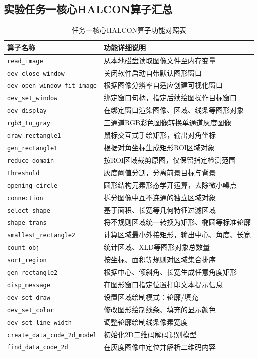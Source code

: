 \documentclass[UTF8,a4paper,12pt]{ctexart}
\begin{document}
\subsection{实验任务一核心HALCON算子汇总}
\begin{table}[H]
\centering
\caption{任务一核心HALCON算子功能对照表}
\begin{tabularx}{0.94\textwidth}{|l|X|}
\hline
\textbf{算子名称} & \textbf{功能详细说明} \\
\hline
\texttt{read\_image} & 从本地磁盘读取图像文件至内存变量 \\
\texttt{dev\_close\_window} & 关闭软件启动自带默认图形窗口 \\
\texttt{dev\_open\_window\_fit\_image} & 根据图像分辨率自适应创建可视化窗口 \\
\texttt{dev\_set\_window} & 绑定窗口句柄，指定后续绘图操作目标窗口 \\
\texttt{dev\_display} & 在绑定窗口渲染图像、区域、线条等图形对象 \\
\texttt{rgb3\_to\_gray} & 三通道RGB彩色图像转换单通道灰度图像 \\
\texttt{draw\_rectangle1} & 鼠标交互式手绘矩形，输出对角坐标 \\
\texttt{gen\_rectangle1} & 根据对角坐标生成矩形ROI区域对象 \\
\texttt{reduce\_domain} & 按ROI区域裁剪原图，仅保留指定检测范围 \\
\texttt{threshold} & 灰度阈值分割，分离前景目标与背景 \\
\texttt{opening\_circle} & 圆形结构元素形态学开运算，去除微小噪点 \\
\texttt{connection} & 拆分图像中互不连通的独立区域对象 \\
\texttt{select\_shape} & 基于面积、长宽等几何特征过滤区域 \\
\texttt{shape\_trans} & 将不规则区域统一转换为矩形、椭圆等标准轮廓 \\
\texttt{smallest\_rectangle2} & 计算区域最小外接矩形，输出中心、角度、长宽 \\
\texttt{count\_obj} & 统计区域、XLD等图形对象总数量 \\
\texttt{sort\_region} & 按坐标、面积等规则对区域集合排序 \\
\texttt{gen\_rectangle2} & 根据中心、倾斜角、长宽生成任意角度矩形 \\
\texttt{disp\_message} & 在图形窗口指定位置打印文本提示信息 \\
\texttt{dev\_set\_draw} & 设置区域绘制模式：轮廓/填充 \\
\texttt{dev\_set\_color} & 修改图形绘制线条、填充的显示颜色 \\
\texttt{dev\_set\_line\_width} & 调整轮廓绘制线条像素宽度 \\
\texttt{create\_data\_code\_2d\_model} & 初始化2D二维码解码识别模型 \\
\texttt{find\_data\_code\_2d} & 在灰度图像中定位并解析二维码内容 \\
\hline
\end{tabularx}
\end{table}
\end{document}
